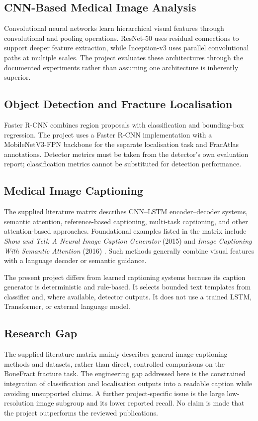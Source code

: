 \documentclass{article}
\begin{document}
\subsection{CNN-Based Medical Image Analysis}
Convolutional neural networks learn hierarchical visual features through convolutional and pooling operations. ResNet-50 \cite{he2016deep} uses residual connections to support deeper feature extraction, while Inception-v3 \cite{szegedy2016rethinking} uses parallel convolutional paths at multiple scales. The project evaluates these architectures through the documented experiments rather than assuming one architecture is inherently superior.

\subsection{Object Detection and Fracture Localisation}
Faster R-CNN \cite{ren2015faster} combines region proposals with classification and bounding-box regression. The project uses a Faster R-CNN implementation with a MobileNetV3-FPN backbone \cite{howard2019searching, lin2017feature} for the separate localisation task and FracAtlas \cite{rahman2023fracatlas} annotations. Detector metrics must be taken from the detector's own evaluation report; classification metrics cannot be substituted for detection performance.

\subsection{Medical Image Captioning}
The supplied literature matrix describes CNN--LSTM encoder--decoder systems, semantic attention, reference-based captioning, multi-task captioning, and other attention-based approaches. Foundational examples listed in the matrix include \textit{Show and Tell: A Neural Image Caption Generator} (2015) \cite{vinyals2015show} and \textit{Image Captioning With Semantic Attention} (2016) \cite{you2016image}. Such methods generally combine visual features with a language decoder or semantic guidance.

The present project differs from learned captioning systems because its caption generator is deterministic and rule-based. It selects bounded text templates from classifier and, where available, detector outputs. It does not use a trained LSTM, Transformer, or external language model.

\subsection{Research Gap}
The supplied literature matrix mainly describes general image-captioning methods and datasets, rather than direct, controlled comparisons on the BoneFract fracture task. The engineering gap addressed here is the constrained integration of classification and localisation outputs into a readable caption while avoiding unsupported claims. A further project-specific issue is the large low-resolution image subgroup and its lower reported recall. No claim is made that the project outperforms the reviewed publications.
\end{document}
